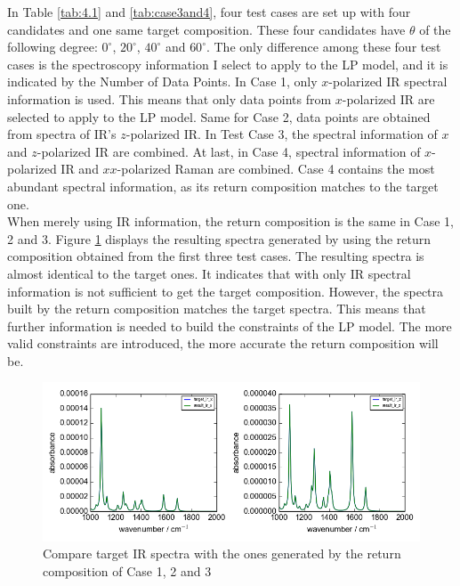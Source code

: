 In Table \ref{tab:4.1} and \ref{tab:case3and4}, four test cases are set up with four candidates and one same target composition. These four candidates have $\theta$ of the following degree: $0^{\circ}$, $20^{\circ}$, $40^{\circ}$ and $60^{\circ}$. The only difference among these four test cases is the spectroscopy information I select to apply to the LP model, and it is indicated by the Number of Data Points. In Case 1, only $x$-polarized IR spectral information is used. This means that only data points from $x$-polarized IR are selected to apply to the LP model. Same for Case 2, data points are obtained from spectra of IR's $z$-polarized IR. In Test Case 3, the spectral information of $x$ and $z$-polarized IR are combined. At last, in Case 4, spectral information of $x$-polarized IR and $xx$-polarized Raman are combined. Case 4 contains the most abundant spectral information, as its return composition matches to the target one. \\

When merely using IR information, the return composition is the same in Case 1, 2 and 3. Figure \ref{fig:4.1} displays the resulting spectra generated by using the return composition obtained from the first three test cases. The resulting spectra is almost identical to the target ones. It indicates that with only IR spectral information is not sufficient to get the target composition.  However, the spectra built by the return composition matches the target spectra. This means that further information is needed to build the constraints of the LP model. The more valid constraints are introduced, the more accurate the return composition will be. \\

\begin{figure}[!ht]
\centering
\includegraphics[scale=0.7]{Figures/ir_xz_result_plotting_remove_space.png}
\caption{Compare target IR spectra with the ones generated by the return composition of Case 1, 2 and 3}  \label{fig:4.1}
\end{figure}

